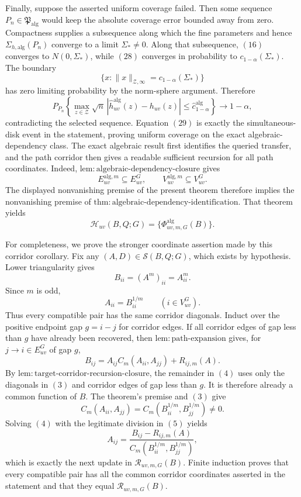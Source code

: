 Finally, suppose the asserted uniform coverage failed.  Then some sequence \(P_n\in\mathfrak P_{\mathrm{alg}}\) would keep the absolute coverage error bounded away from zero.  Compactness supplies a subsequence along which the fine parameters and hence \(\Sigma_{h,\mathrm{alg}}(P_n)\) converge to a limit \(\Sigma_*\ne0\).  Along that subsequence, \((16)\) converges to \(N(0,\Sigma_*)\), while \((28)\) converges in probability to \(c_{1-\alpha}(\Sigma_*)\).  The boundary
\[
 \{x:\|x\|_{\mathcal Z,\infty}=c_{1-\alpha}(\Sigma_*)\}
\]
has zero limiting probability by the norm-sphere argument.  Therefore
\[
 P_{P_n}\!\left\{
 \max_{z\in\mathcal Z}\sqrt n\,
 |\widehat h_{uv}^{\mathrm{alg}}(z)-h_{uv}(z)|
 \le\widehat c_{1-\alpha}^{\mathrm{alg}}
 \right\}\longrightarrow1-\alpha,
\tag{29}
\]
contradicting the selected sequence.  Equation \((29)\) is exactly the simultaneous-disk event in the statement, proving uniform coverage on the exact algebraic-dependency class.
The exact algebraic result first identifies the queried transfer, and the path corridor then gives a readable sufficient recursion for all path coordinates.  Indeed, \(\mathrm{lem{:}algebraic\mbox{-}dependency\mbox{-}closure}\) gives
\[
 E_{uv}^{\mathrm{alg},m}\subseteq E_{uv}^{G},
 \qquad
 V_{uv}^{\mathrm{alg},m}\subseteq V_{uv}^{G}.
\tag{1}
\]
The displayed nonvanishing premise of the present theorem therefore implies the nonvanishing premise of \(\mathrm{thm{:}algebraic\mbox{-}dependency\mbox{-}identification}\).  That theorem yields
\[
 \mathcal H_{uv}(B,Q;G)
 =\{\Phi^{\mathrm{alg}}_{uv,m,G}(B)\}.
\tag{2}
\]

For completeness, we prove the stronger coordinate assertion made by this corridor corollary.  Fix any
\((A,D)\in\mathcal S(B,Q;G)\), which exists by hypothesis.  Lower triangularity gives
\[
 B_{ii}=(A^m)_{ii}=A_{ii}^m.
\]
Since \(m\) is odd,
\[
 A_{ii}=B_{ii}^{1/m}
 \qquad(i\in V_{uv}^{G}).
\tag{3}
\]
Thus every compatible pair has the same corridor diagonals.  Induct over the positive endpoint gap \(g=i-j\) for corridor edges.  If all corridor edges of gap less than \(g\) have already been recovered, then \(\mathrm{lem{:}path\mbox{-}expansion}\) gives, for \(j\to i\in E_{uv}^{G}\) of gap \(g\),
\[
 B_{ij}=A_{ij}C_m(A_{ii},A_{jj})+R_{ij,m}(A).
\tag{4}
\]
By \(\mathrm{lem{:}target\mbox{-}corridor\mbox{-}recursion\mbox{-}closure}\), the remainder in \((4)\) uses only the diagonals in \((3)\) and corridor edges of gap less than \(g\).  It is therefore already a common function of \(B\).  The theorem's premise and \((3)\) give
\[
 C_m(A_{ii},A_{jj})
 =C_m(B_{ii}^{1/m},B_{jj}^{1/m})\ne0.
\tag{5}
\]
Solving \((4)\) with the legitimate division in \((5)\) yields
\[
 A_{ij}
 =\frac{B_{ij}-R_{ij,m}(A)}
 {C_m(B_{ii}^{1/m},B_{jj}^{1/m})},
\tag{6}
\]
which is exactly the next update in \(\mathscr R_{uv,m,G}(B)\).  Finite induction proves that every compatible pair has all the common corridor coordinates asserted in the statement and that they equal \(\mathscr R_{uv,m,G}(B)\).

